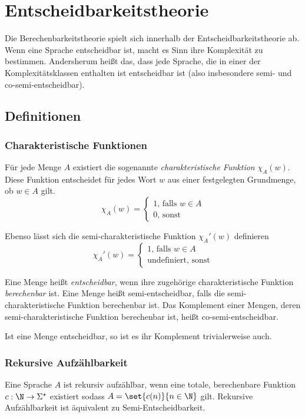 \chapter{Entscheidbarkeitstheorie}
Die Berechenbarkeitstheorie spielt sich innerhalb der Entscheidbarkeitstheorie ab. Wenn eine Sprache entscheidbar ist, macht es Sinn ihre Komplexität zu bestimmen. Andersherum heißt das, dass jede Sprache, die in einer der Komplexitätsklassen enthalten ist entscheidbar ist (also insbesondere semi- und co-semi-entscheidbar).

\section{Definitionen}
\subsection{Charakteristische Funktionen}
Für jede Menge $A$ existiert die sogenannte \emph{charakteristische Funktion} $\chi_A(w)$. Diese Funktion entscheidet für jedes Wort $w$ aus einer festgelegten Grundmenge, ob $w\in A$ gilt.
\begin{equation*}
	\chi_A(w)=\begin{cases}
		1\text{, falls } w\in A\\
		0\text{, sonst}
	\end{cases}
\end{equation*}

Ebenso lässt sich die semi-charakteristische Funktion $\chi_A'(w)$ definieren
\begin{equation*}
	\chi_A'(w)=\begin{cases}
		1\text{, falls } w\in A\\
		\mathrm{undefiniert}\text{, sonst}
	\end{cases}
\end{equation*}

Eine Menge heißt \emph{entscheidbar}, wenn ihre zugehörige charakteristische Funktion \emph{berechenbar} ist. Eine Menge heißt semi-entscheidbar, falls die semi-charakteristische Funktion berechenbar ist. Das Komplement einer Mengen, deren semi-charakteristische Funktion berechenbar ist, heißt co-semi-entscheidbar.

Ist eine Menge entscheidbar, so ist es ihr Komplement trivialerweise auch.

\subsection{Rekursive Aufzählbarkeit}
Eine Sprache $A$ ist rekursiv aufzählbar, wenn eine totale, berechenbare Funktion $c:\N\rightarrow\Sigma^\star$ existiert sodass $A=\set{c(n)}{n\in\N}$ gilt. Rekursive Aufzählbarkeit ist äquivalent zu Semi-Entscheidbarkeit.

